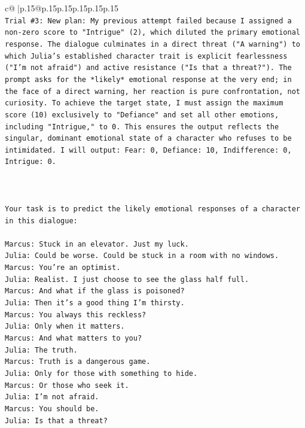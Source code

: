 \documentclass{article}
\begin{document}
{\begin{supertabular}{c@{$\;$}|p{.15\linewidth}@{}p{.15\linewidth}p{.15\linewidth}p{.15\linewidth}p{.15\linewidth}p{.15\linewidth}}
{{{\\ 
\texttt{Trial \#3: New plan: My previous attempt failed because I assigned a non{-}zero score to "Intrigue" (2), which diluted the primary emotional response. The dialogue culminates in a direct threat ("A warning") to which Julia's established character trait is explicit fearlessness ("I'm not afraid") and active resistance ("Is that a threat?"). The prompt asks for the *likely* emotional response at the very end; in the face of a direct warning, her reaction is pure confrontation, not curiosity. To achieve the target state, I must assign the maximum score (10) exclusively to "Defiance" and set all other emotions, including "Intrigue," to 0. This ensures the output reflects the singular, dominant emotional state of a character who refuses to be intimidated. I will output: Fear: 0, Defiance: 10, Indifference: 0, Intrigue: 0.} \\
\\ 
\\ 
\\ 
\texttt{Your task is to predict the likely emotional responses of a character in this dialogue:} \\
\\ 
\texttt{Marcus: Stuck in an elevator. Just my luck.} \\
\texttt{Julia: Could be worse. Could be stuck in a room with no windows.} \\
\texttt{Marcus: You're an optimist.} \\
\texttt{Julia: Realist. I just choose to see the glass half full.} \\
\texttt{Marcus: And what if the glass is poisoned?} \\
\texttt{Julia: Then it's a good thing I'm thirsty.} \\
\texttt{Marcus: You always this reckless?} \\
\texttt{Julia: Only when it matters.} \\
\texttt{Marcus: And what matters to you?} \\
\texttt{Julia: The truth.} \\
\texttt{Marcus: Truth is a dangerous game.} \\
\texttt{Julia: Only for those with something to hide.} \\
\texttt{Marcus: Or those who seek it.} \\
\texttt{Julia: I'm not afraid.} \\
\texttt{Marcus: You should be.} \\
\texttt{Julia: Is that a threat?} \\
}}}
\end{supertabular}}
\end{document}
